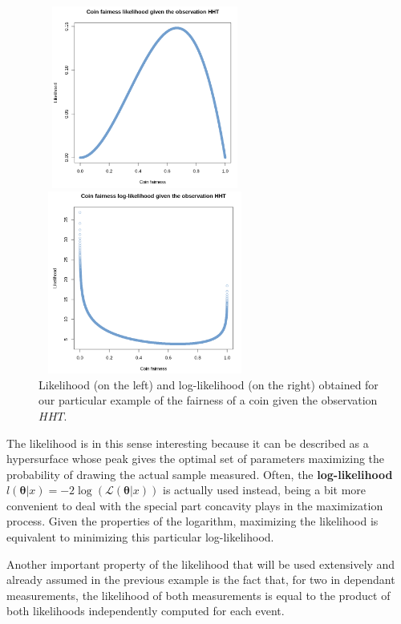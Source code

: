 \documentclass[a4paper, 11pt]{report}
\begin{document}
\begin{figure}[htbp]
\centering
\begin{minipage}[b]{.49\textwidth}
\includegraphics[width=7cm, height=6cm]{figs/likelihood.png}
\end{minipage}\hfill
\begin{minipage}[b]{.49\textwidth}
\includegraphics[width=7cm, height=6cm]{figs/loglikelihood.png}
\end{minipage} \hfill
\caption{Likelihood (on the left) and log-likelihood (on the right) obtained for our particular example of the fairness of a coin given the observation $HHT$.}
\label{fig:likelihoodEx}
\end{figure}

The likelihood is in this sense interesting because it can be described as a hypersurface whose peak gives the optimal set of parameters maximizing the probability of drawing the actual sample measured. Often, the \textbf{log-likelihood} $l(\bm \theta | x) = -2 \log(\mathcal{L}(\bm \theta | x))$ is actually used instead, being a bit more convenient to deal with the special part concavity plays in the maximization process. Given the properties of the logarithm, maximizing the likelihood is equivalent to minimizing this particular log-likelihood.

Another important property of the likelihood that will be used extensively and already assumed in the previous example is the fact that, for two in dependant measurements, the likelihood of both measurements is equal to the product of both likelihoods independently computed for each event.
\end{document}
